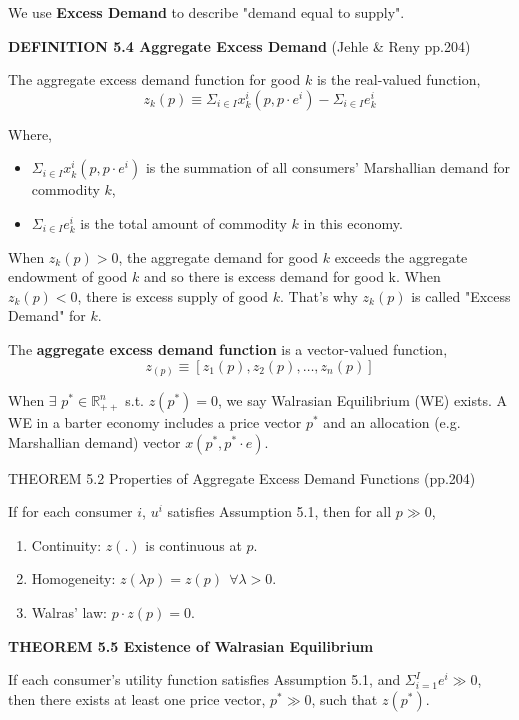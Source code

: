 \documentclass{article}
\newcommand{\R}{\mathbb{R}}
\begin{document}
\begin{mdframed}[backgroundcolor=blue!20,linecolor=white]
We use \textbf{Excess Demand} to describe "demand equal to supply".
\vspace{2mm}

\textbf{DEFINITION 5.4 Aggregate Excess Demand} (Jehle \& Reny pp.204)

The aggregate excess demand function for good $k$ is the real-valued function,
$$z_k(p) \equiv \Sigma_{i \in I } x^i_k(p,p\cdot e^i) - \Sigma_{i \in I } e^i_k$$

Where,
\begin{itemize}
\item $\Sigma_{i \in I } x^i_k(p,p\cdot e^i)$ is the summation of all consumers' Marshallian demand for commodity $k$,
\item $\Sigma_{i \in I } e^i_k$ is the total amount of commodity $k$ in this economy.
\end{itemize}

When $z_k(p) > 0$, the aggregate demand for good $k$ exceeds the aggregate endowment of good $k$ and so there is excess demand for good k. When $z_k(p) < 0$, there is excess supply of good $k$. That's why $z_k(p)$ is called "Excess Demand" for $k$.
\vspace{2mm}

The \textbf{aggregate excess demand function} is a vector-valued function,
$$z_(p) \equiv [z_1(p),z_2(p),\dots,z_n(p)]$$

\vspace{2mm}


When $\exists$ $p^* \in \R^n_{++}$ s.t. $z(p^*) = 0$, we say
Walrasian Equilibrium (WE) exists. A WE in a barter economy includes a price vector $p^*$ and an allocation (e.g. Marshallian demand) vector $x(p^*,p^*\cdot e)$.

\vspace{4mm}

THEOREM 5.2 Properties of Aggregate Excess Demand Functions (pp.204)

If for each consumer $i$, $u^i$ satisfies Assumption 5.1, then for all $p \gg 0$,


\begin{enumerate}
\item Continuity: $z(.)$ is continuous at $p$.
\item Homogeneity: $z(\lambda p) = z(p) \ \ \forall \lambda > 0$.
\item Walras' law: $p \cdot z(p) = 0$.
\end{enumerate}

\vspace{4mm}

\textbf{THEOREM 5.5 Existence of Walrasian Equilibrium}

If each consumer's utility function satisfies Assumption 5.1, and
$\Sigma_{i=1}^{I} e^i \gg 0$, then there exists at least one price vector, $p^* \gg 0$, such that $z(p^*)$.


\end{mdframed}
\end{document}
